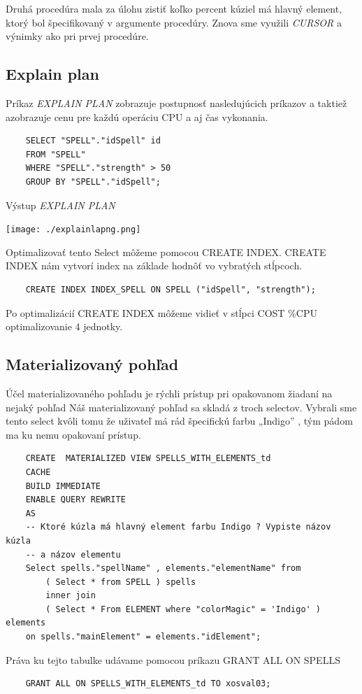 \documentclass{article}
\begin{document}
    \Large{Druhá procedúra mala za úlohu zistiť koľko percent kúziel má hlavný element, ktorý bol špecifikovaný v argumente procedúry. Znova sme využili \textit{CURSOR} a výnimky ako pri prvej procedúre.}
    \newpage
    
    
    \subsection{Explain plan}
    \Large{Príkaz \textit{EXPLAIN PLAN} zobrazuje  postupnosť nasledujúcich príkazov  a taktiež azobrazuje cenu pre každú operáciu  CPU a aj čas vykonania.}
    \Large{}
    \begin{center}
        \begin{verbatim}
    SELECT "SPELL"."idSpell" id
    FROM "SPELL"
    WHERE "SPELL"."strength" > 50
    GROUP BY "SPELL"."idSpell";
        \end{verbatim}
    \end{center}
    \Large{Výstup \textit{EXPLAIN PLAN}}
    \begin{center}\texttt{[image: ./explainlapng.png]}\\[1cm]
    \end{center}
    \Large{Optimalizovať tento Select môžeme pomocou CREATE INDEX. CREATE INDEX nám vytvorí index na základe hodnôť vo vybratých stĺpcoch.}
    \begin{verbatim}
    CREATE INDEX INDEX_SPELL ON SPELL ("idSpell", "strength");
    \end{verbatim}
    \Large{Po optimalizácií CREATE INDEX  môžeme vidieť v stĺpci COST \%CPU optimalizovanie 4 jednotky.}
    \newpage
    
    \subsection{Materializovaný pohľad}
    \Large{Účel materializovaného pohľadu je rýchli prístup pri opakovanom žiadaní na nejaký pohľad
    Náš materializovaný pohľad sa skladá z troch selectov. Vybrali sme tento select kvôli tomu že uživateľ má rád špecifickú farbu „Indigo” , tým pádom ma ku nemu opakovaní prístup.
    }
    \begin{verbatim}
    CREATE  MATERIALIZED VIEW SPELLS_WITH_ELEMENTS_td
    CACHE
    BUILD IMMEDIATE
    ENABLE QUERY REWRITE
    AS
    -- Ktoré kúzla má hlavný element farbu Indigo ? Vypiste názov kúzla 
    -- a názov elementu
    Select spells."spellName" , elements."elementName" from
        ( Select * from SPELL ) spells
        inner join
        ( Select * From ELEMENT where "colorMagic" = 'Indigo' ) elements
    on spells."mainElement" = elements."idElement";
    \end{verbatim}
    \Large{Práva ku tejto tabulke udávame pomocou príkazu GRANT ALL ON SPELLS}
    \begin{verbatim}
    GRANT ALL ON SPELLS_WITH_ELEMENTS_td TO xosval03;
    \end{verbatim}
\end{document}

